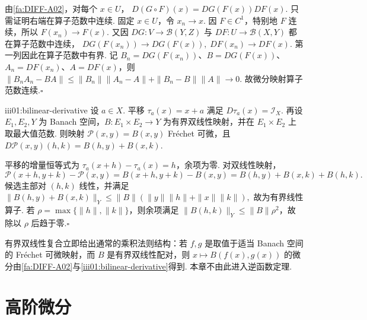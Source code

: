 \begin{FAProof}
由\autoref{fa:DIFF-A02}，对每个 \(\displaystyle x\in U\)，
\(\displaystyle D(G\circ F)(x) = DG(F(x))DF(x).\)
只需证明右端在算子范数中连续. 固定 \(\displaystyle x\in U\)，令 \(\displaystyle x_n\to x\). 因 \(\displaystyle F\in C^1\)，特别地 \(\displaystyle F\) 连续，所以 \(\displaystyle F(x_n)\to F(x)\). 又因 \(\displaystyle DG:V\to\mathcal B(Y,Z)\) 与 \(\displaystyle DF:U\to\mathcal B(X,Y)\) 都在算子范数中连续，
\(\displaystyle DG(F(x_n))\to DG(F(x)), \; DF(x_n)\to DF(x).\)
第一列因此在算子范数中有界. 记 \(\displaystyle B_n=DG(F(x_n))\)、\(\displaystyle B=DG(F(x))\)、\(\displaystyle A_n=DF(x_n)\)、\(\displaystyle A=DF(x)\)，则
\(\displaystyle \|B_nA_n-BA\| \leqslant \|B_n\|\|A_n-A\|+\|B_n-B\|\|A\| \longrightarrow0.\)
故微分映射算子范数连续.\hfill\(\square\)
\end{FAProof}

\begin{FAProposition}[B][平移与有界双线性映射的微分]{iii01:bilinear-derivative}
设 \(\displaystyle a\in X\). 平移 \(\displaystyle\tau_a(x)=x+a\) 满足 \(\displaystyle D\tau_a(x)=\mathcal I_X\). 再设 \(\displaystyle E_1,E_2,Y\) 为 Banach 空间，\(\displaystyle B:E_1\times E_2\to Y\) 为有界双线性映射，并在 \(\displaystyle E_1\times E_2\) 上取最大值范数. 则映射 \(\displaystyle\mathcal P(x,y)=B(x,y)\) Fréchet 可微，且
\(\displaystyle D\mathcal P(x,y)(h,k) = B(h,y)+B(x,k).\)
\end{FAProposition}

\begin{FAProof}
平移的增量恒等式为 \(\displaystyle\tau_a(x+h)-\tau_a(x)=h\)，余项为零. 对双线性映射，
\[
\mathcal P(x+h,y+k)-\mathcal P(x,y) =B(x+h,y+k)-B(x,y) =B(h,y)+B(x,k)+B(h,k).
\]
候选主部对 \(\displaystyle(h,k)\) 线性，并满足
\(\displaystyle \|B(h,y)+B(x,k)\|_Y \leqslant \|B\|(\|y\|\|h\|+\|x\|\|k\|),\)
故为有界线性算子. 若 \(\displaystyle\rho=\max\{\|h\|,\|k\|\}\)，则余项满足 \(\displaystyle\|B(h,k)\|_Y\leqslant\|B\|\rho^2\)，故除以 \(\displaystyle\rho\) 后趋于零.\hfill\(\square\)
\end{FAProof}

有界双线性复合立即给出通常的乘积法则结构：若 \(\displaystyle f,g\) 是取值于适当 Banach 空间的 Fréchet 可微映射，而 \(\displaystyle B\) 是有界双线性配对，则 \(\displaystyle x\mapsto B(f(x),g(x))\) 的微分由\autoref{fa:DIFF-A02}与\autoref{iii01:bilinear-derivative}得到. 本章不由此进入逆函数定理.

\section{高阶微分}\label{sec:iii01-higher}

